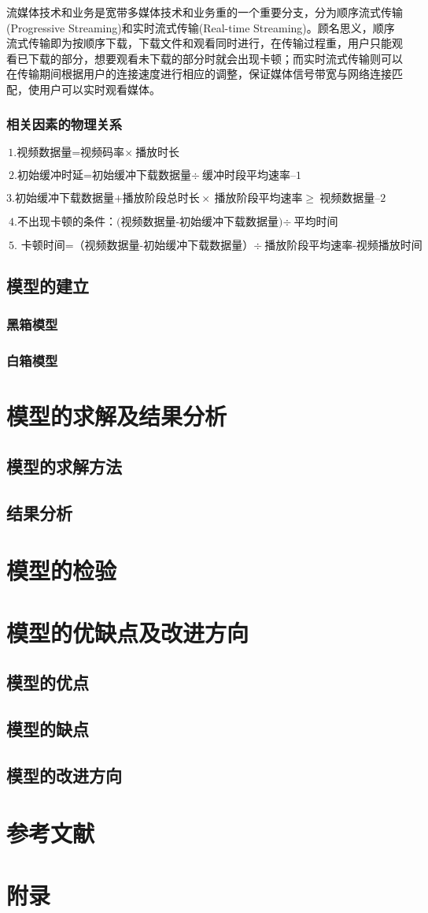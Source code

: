 \documentclass[UTF8]{ctexart}
\begin{document}
流媒体技术和业务是宽带多媒体技术和业务重的一个重要分支，分为顺序流式传输(Progressive Streaming)和实时流式传输(Real-time Streaming)。顾名思义，顺序流式传输即为按顺序下载，下载文件和观看同时进行，在传输过程重，用户只能观看已下载的部分，想要观看未下载的部分时就会出现卡顿；而实时流式传输则可以在传输期间根据用户的连接速度进行相应的调整，保证媒体信号带宽与网络连接匹配，使用户可以实时观看媒体。

\subsubsection{相关因素的物理关系}
$ \text{1.视频数据量=视频码率} \times\ \text{播放时长} $

$ \text{2.初始缓冲时延=初始缓冲下载数据量} \div\ \text{缓冲时段平均速率--1} $

$ \text{3.初始缓冲下载数据量+播放阶段总时长} \times\ \text{播放阶段平均速率}\geq\ \text{视频数据量--2} $

$ \text{4.不出现卡顿的条件：(视频数据量-初始缓冲下载数据量)} \div\ \text{平均时间} $

$ \text{5. 卡顿时间=（视频数据量-初始缓冲下载数据量）}\div\ \text{播放阶段平均速率-视频播放时间} $
\subsection{模型的建立}
\subsubsection{黑箱模型}
\subsubsection{白箱模型}
\section{模型的求解及结果分析}
\subsection{模型的求解方法}
\subsection{结果分析}

\section{模型的检验}
\section{模型的优缺点及改进方向}
\subsection{模型的优点}
\subsection{模型的缺点}
\subsection{模型的改进方向}
\section{参考文献}
\section{附录}
\end{document}

